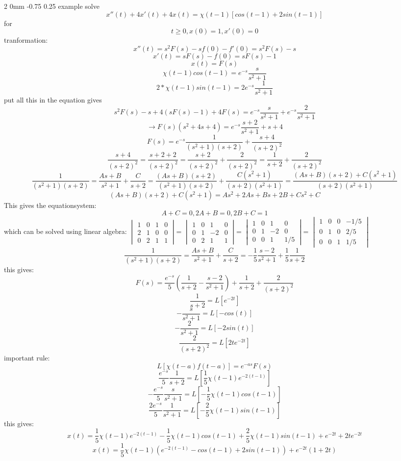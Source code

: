 \documentclass[a4paper,11pt]{article}
\makeatletter
\renewcommand{\subsection}{\@startsection
   {subsection}%
   {2}%
   {0mm}%
   {-0.75\baselineskip}%
   {0.25\baselineskip}%
   {\rmfamily\normalfont\slshape\normalsize}}%
\makeatother
\begin{document}
\subsection{example}
solve
$$x''(t)+4x'(t)+4x(t)=\chi(t-1)[cos(t-1)+2sin(t-1)]$$
for
$$t\geq0,x(0)=1,x'(0)=0$$
tranformation:
$$x''(t)=s^2F(s)-sf(0)-f'(0)=s^2F(s)-s$$
$$x'(t)=sF(s)-f(0)=sF(s)-1$$
$$x(t)=F(s)$$
$$\chi(t-1)cos(t-1)=e^{-s}\dfrac{s}{s^2+1}$$
$$2*\chi(t-1)sin(t-1)=2e^{-s}\dfrac{1}{s^2+1}$$
put all this in the equation gives
$$s^2F(s)-s+4(sF(s)-1)+4F(s)=e^{-s}\dfrac{s}{s^2+1}+e^{-s}\dfrac{2}{s^2+1}$$
$$\rightarrow F(s)(s^2+4s+4)=e^{-s}\dfrac{s+2}{s^2+1}+s+4$$
$$F(s)=e^{-s}\dfrac{1}{(s^2+1)(s+2)}+\dfrac{s+4}{(s+2)^2}$$
$$\dfrac{s+4}{(s+2)^2}=\dfrac{s+2+2}{(s+2)^2}=\dfrac{s+2}{(s+2)^2}+\dfrac{2}{(s+2)^2}=\dfrac{1}{s+2}+\dfrac{2}{(s+2)^2}$$
$$\dfrac{1}{(s^2+1)(s+2)}=\dfrac{As+B}{s^2+1}+\dfrac{C}{s+2}=\dfrac{(As+B)(s+2)}{(s^2+1)(s+2)}+\dfrac{C(s^2+1)}{(s+2)(s^2+1)}=\dfrac{(As+B)(s+2)+C(s^2+1)}{(s+2)(s^2+1)}$$
$$(As+B)(s+2)+C(s^2+1)=As^2+2As+Bs+2B+Cs^2+C$$
This gives the equationsystem:
$$A+C=0,2A+B=0,2B+C=1$$
which can be solved using linear algebra:\newline
$ \begin{vmatrix} 1&0&1&0\\ 2&1&0&0\\0&2&1&1 \end{vmatrix}$=
$ \begin{vmatrix} 1&0&1&0\\ 0&1&-2&0\\0&2&1&1 \end{vmatrix}$=
$ \begin{vmatrix} 1&0&1&0\\ 0&1&-2&0\\0&0&1&1/5 \end{vmatrix}$=
$ \begin{vmatrix} 1&0&0&-1/5\\ 0&1&0&2/5\\0&0&1&1/5 \end{vmatrix}$
$$\dfrac{1}{(s^2+1)(s+2)}=\dfrac{As+B}{s^2+1}+\dfrac{C}{s+2}=-\dfrac{1}{5}\dfrac{s-2}{s^2+1}+\dfrac{1}{5}\dfrac{1}{s+2}$$
this gives:
$$F(s)=\dfrac{e^{-s}}{5}(\dfrac{1}{s+2}-\dfrac{s-2}{s^2+1})+\dfrac{1}{s+2}+\dfrac{2}{(s+2)^2}$$
$$\dfrac{1}{s+2}=L[e^{-2t}]$$
$$-\dfrac{s}{s^2+1}=L[-cos(t)]$$
$$-\dfrac{2}{s^2+1}=L[-2sin(t)]$$
$$\dfrac{2}{(s+2)^2}=L[2te^{-2t}]$$
important rule:
$$L[\chi(t-a)f(t-a)]=e^{-as}F(s)$$
$$\dfrac{e^{-s}}{5}\dfrac{1}{s+2}=L[\dfrac{1}{5}\chi(t-1)e^{-2(t-1)}]$$
$$-\dfrac{e^{-s}}{5}\dfrac{s}{s^2+1}=L[-\dfrac{1}{5}\chi(t-1)cos(t-1)]$$
$$\dfrac{2e^{-s}}{5}\dfrac{1}{s^2+1}=L[-\dfrac{2}{5}\chi(t-1)sin(t-1)]$$
this gives:
$$x(t)=\dfrac{1}{5}\chi(t-1)e^{-2(t-1)}-\dfrac{1}{5}\chi(t-1)cos(t-1)+\dfrac{2}{5}\chi(t-1)sin(t-1)+e^{-2t}+2te^{-2t}$$
$$x(t)=\dfrac{1}{5}\chi(t-1)(e^{-2(t-1)}-cos(t-1)+2sin(t-1))+e^{-2t}(1+2t)$$
\end{document}
